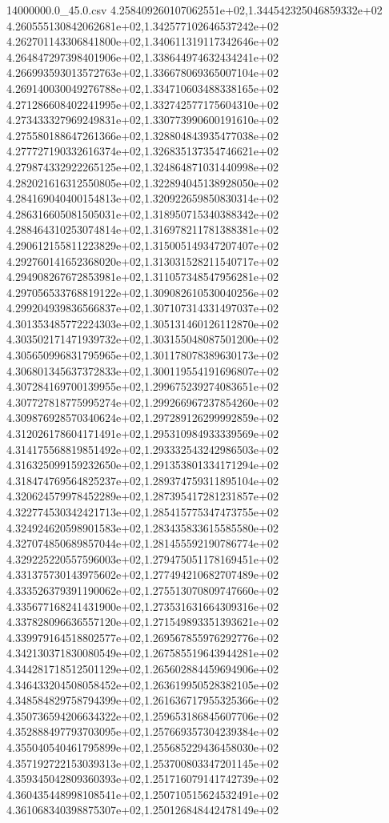 \begin{filecontents*}{14000000.0_45.0.csv}
4.258409260107062551e+02,1.344542325046859332e+02
4.260555130842062681e+02,1.342577102646537242e+02
4.262701143306841800e+02,1.340611319117342646e+02
4.264847297398401906e+02,1.338644974632434241e+02
4.266993593013572763e+02,1.336678069365007104e+02
4.269140030049276788e+02,1.334710603488338165e+02
4.271286608402241995e+02,1.332742577175604310e+02
4.273433327969249831e+02,1.330773990600191610e+02
4.275580188647261366e+02,1.328804843935477038e+02
4.277727190332616374e+02,1.326835137354746621e+02
4.279874332922265125e+02,1.324864871031440998e+02
4.282021616312550805e+02,1.322894045138928050e+02
4.284169040400154813e+02,1.320922659850830314e+02
4.286316605081505031e+02,1.318950715340388342e+02
4.288464310253074814e+02,1.316978211781388381e+02
4.290612155811223829e+02,1.315005149347207407e+02
4.292760141652368020e+02,1.313031528211540717e+02
4.294908267672853981e+02,1.311057348547956281e+02
4.297056533768819122e+02,1.309082610530040256e+02
4.299204939836566837e+02,1.307107314331497037e+02
4.301353485772224303e+02,1.305131460126112870e+02
4.303502171471939732e+02,1.303155048087501200e+02
4.305650996831795965e+02,1.301178078389630173e+02
4.306801345637372833e+02,1.300119554191696807e+02
4.307284169700139955e+02,1.299675239274083651e+02
4.307727818775995274e+02,1.299266967237854260e+02
4.309876928570340624e+02,1.297289126299992859e+02
4.312026178604171491e+02,1.295310984933339569e+02
4.314175568819851492e+02,1.293332543242986503e+02
4.316325099159232650e+02,1.291353801334171294e+02
4.318474769564825237e+02,1.289374759311895104e+02
4.320624579978452289e+02,1.287395417281231857e+02
4.322774530342421713e+02,1.285415775347473755e+02
4.324924620598901583e+02,1.283435833615585580e+02
4.327074850689857044e+02,1.281455592190786774e+02
4.329225220557596003e+02,1.279475051178169451e+02
4.331375730143975602e+02,1.277494210682707489e+02
4.333526379391190062e+02,1.275513070809747660e+02
4.335677168241431900e+02,1.273531631664309316e+02
4.337828096636557120e+02,1.271549893351393621e+02
4.339979164518802577e+02,1.269567855976292776e+02
4.342130371830080549e+02,1.267585519643944281e+02
4.344281718512501129e+02,1.265602884459694906e+02
4.346433204508058452e+02,1.263619950528382105e+02
4.348584829758794399e+02,1.261636717955325366e+02
4.350736594206634322e+02,1.259653186845607706e+02
4.352888497793703095e+02,1.257669357304239384e+02
4.355040540461795899e+02,1.255685229436458030e+02
4.357192722153039313e+02,1.253700803347201145e+02
4.359345042809360393e+02,1.251716079141742739e+02
4.360435448998108541e+02,1.250710515624532491e+02
4.361068340398875307e+02,1.250126848442478149e+02

\end{filecontents*}
